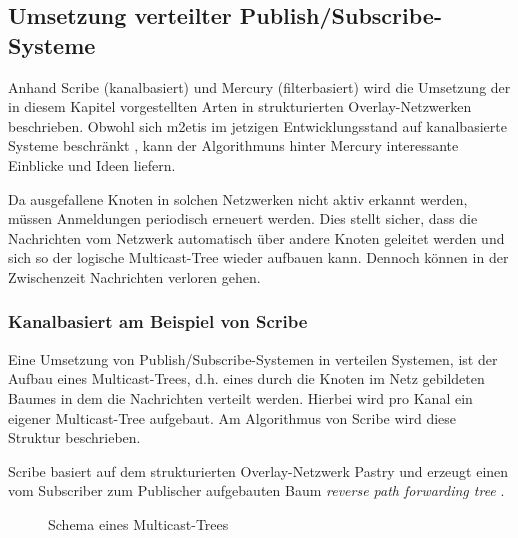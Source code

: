 \subsection{Umsetzung verteilter Publish/Subscribe-Systeme}
Anhand Scribe (kanalbasiert) \cite{Castro2002Scribe} und Mercury (filterbasiert) \cite{Bharambe2004Mercury} wird die Umsetzung der in diesem Kapitel vorgestellten Arten in strukturierten Overlay-Netzwerken beschrieben. Obwohl sich \ac{m2etis} im jetzigen Entwicklungsstand auf kanalbasierte Systeme beschränkt \cite{Fischer2010a}, kann der Algorithmuns hinter Mercury interessante Einblicke und Ideen liefern.

Da ausgefallene Knoten in solchen Netzwerken nicht aktiv erkannt werden, müssen Anmeldungen periodisch erneuert werden. Dies stellt sicher, dass die Nachrichten vom Netzwerk automatisch über andere Knoten geleitet werden und sich so der logische Multicast-Tree wieder aufbauen kann. Dennoch können in der Zwischenzeit Nachrichten verloren gehen.

\subsubsection*{Kanalbasiert am Beispiel von Scribe}
\label{chap:related:scribe}
Eine Umsetzung von Publish/Subscribe-Systemen in verteilen Systemen, ist der Aufbau eines Multicast-Trees, d.h. eines durch die Knoten im Netz gebildeten Baumes in dem die Nachrichten verteilt werden. Hierbei wird pro Kanal ein eigener Multicast-Tree aufgebaut. Am Algorithmus von Scribe wird diese Struktur beschrieben.

Scribe basiert auf dem strukturierten Overlay-Netzwerk Pastry \cite{Rowstron2001} und erzeugt einen vom Subscriber zum Publischer aufgebauten Baum \emph{reverse path forwarding tree} \cite{Dalal1978}.

\begin{figure}[htbp]
\centering
{}
\caption{Schema eines Multicast-Trees}
\label{fig:multicast_tree}
\end{figure}

